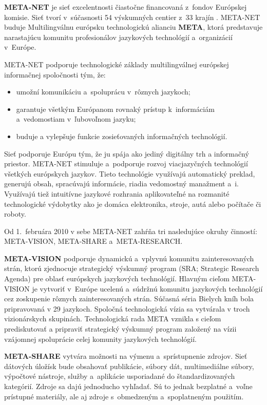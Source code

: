 \begin{multicols}{2}
  \textbf{META-NET} je sieť excelentnosti čiastočne financovaná
  z~fondov Európskej komisie. Sieť tvorí v~súčasnosti 54 výskumných
  centier z~33 krajín \cite{rehm2011}. META-NET buduje Multilingválnu
  európsku technologickú alianciu \textbf{META}, ktorá predstavuje
  narastajúcu komunitu profesionálov jazykových technológií
  a~organizácií v~Európe.

  META-NET podporuje technologické základy multilingválnej európskej
  informačnej spoločnosti tým, že:

\begin{itemize}
\item umožní komunikáciu a~spoluprácu v~rôznych jazykoch;
\item garantuje všetkým Európanom rovnaký prístup k~informáciám
  a~vedomostiam v~ľubovoľnom jazyku;
\item buduje a vylepšuje funkcie zosieťovaných informačných
  technológií.
\end{itemize}

Sieť podporuje Európu tým, že ju spája ako jediný digitálny trh a
informačný priestor. META-NET stimuluje a~podporuje rozvoj
viacjazyčných technológií všetkých európskych jazykov. Tieto
technológie využívajú automatický preklad, generujú obsah, spracúvajú
informácie, riadia vedomostný manažment a~i. Využívajú tiež intuitívne
jazykové rozhrania aplikovateľné na rozmanité technologické výdobytky
ako je domáca elektronika, stroje, autá alebo počítače či roboty.

Od 1.~februára 2010 v sebe META-NET zahŕňa tri nasledujúce okruhy
činností: META-VISION, META-SHARE a~META-RESEARCH.

\textbf{META-VISION} podporuje dynamickú a~vplyvnú komunitu
zainteresovaných strán, ktorú zjednocuje strategický výskumný program
(SRA; Strategic Research Agenda) pre oblasť európskych jazykových
technológií. Hlavným cieľom META-VISION je vytvoriť v~Európe ucelenú
a~súdržnú komunitu jazykových technológií cez zoskupenie rôznych
zainteresovaných strán. Súčasná séria Bielych kníh bola pripravovaná v
29 jazykoch. Spoločná technologická vízia sa vytvárala v troch
vizionárskych skupinách. Technologická rada META vznikla s cieľom
prediskutovať a pripraviť strategický výskumný program založený na
vízii vzájomnej spoluprácie celej komunity jazykových technológií.

\textbf{META-SHARE} vytvára možnosti na výmenu a~sprístupnenie
zdrojov. Sieť dátových úložísk bude obsahovať publikácie, súbory dát,
multimediálne súbory, výpočtové nástroje, služby a~aplikácie
usporiadané do štandardizovaných kategórií. Zdroje sa dajú jednoducho
vyhľadať. Sú to jednak bezplatné a~voľne prístupné materiály, ale aj
zdroje s~obmedzeným a~spoplatneným použitím.


\end{multicols}
